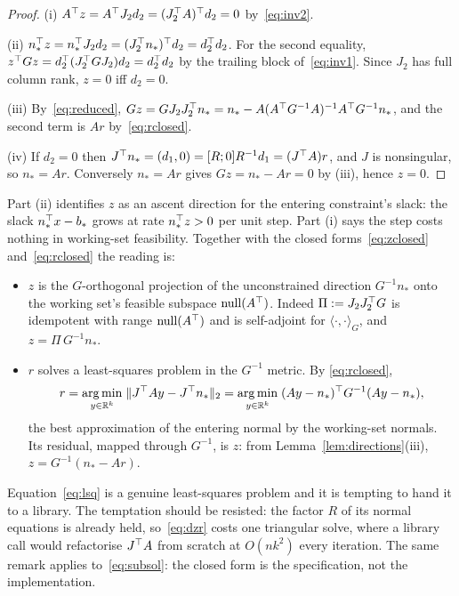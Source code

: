 \begin{proof}
(i) $A^{\top} z = A^{\top} J_2 d_2 = (J_2^{\top} A)^{\top} d_2 = 0$ by~\eqref{eq:inv2}.

(ii) $n_*^{\top} z = n_*^{\top} J_2 d_2 = (J_2^{\top} n_*)^{\top} d_2 = d_2^{\top} d_2$. For the second
equality, $z^{\top} G z = d_2^{\top} (J_2^{\top} G J_2) d_2 = d_2^{\top} d_2$ by the trailing block
of~\eqref{eq:inv1}. Since $J_2$ has full column rank, $z = 0$ iff $d_2 = 0$.

(iii) By~\eqref{eq:reduced}, $Gz = GJ_2J_2^{\top} n_* = n_* - A(A^{\top} G^{-1}A)^{-1}A^{\top}
G^{-1}n_*$, and the second term is $Ar$ by~\eqref{eq:rclosed}.

(iv) If $d_2 = 0$ then $J^{\top} n_* = (d_1,0) = [R;0]R^{-1}d_1 = (J^{\top} A) r$, and $J$
is nonsingular, so $n_* = Ar$. Conversely $n_* = Ar$ gives
$Gz = n_* - Ar = 0$ by (iii), hence $z = 0$.
\end{proof}

Part (ii) identifies $z$ as an ascent direction for the entering constraint's
slack: the slack $n_*^{\top} x - b_*$ grows at rate $n_*^{\top} z > 0$ per unit step. Part
(i) says the step costs nothing in working-set feasibility. Together with the
closed forms~\eqref{eq:zclosed} and~\eqref{eq:rclosed} the reading is:
\begin{itemize}
  \item $z$ is the $G$-orthogonal projection of the unconstrained direction
        $G^{-1}n_*$ onto the working set's feasible subspace $\operatorname{null}(A^{\top})$.
        Indeed $\Pi := J_2 J_2^{\top} G$ is idempotent with range $\operatorname{null}(A^{\top})$ and is
        self-adjoint for $\langle\cdot,\cdot\rangle_G$, and
        $z = \Pi\, G^{-1}n_*$.
  \item $r$ solves a least-squares problem in the $G^{-1}$ metric. By
        \eqref{eq:rclosed},
        \begin{equation}
          r = \operatorname*{arg\,min}_{y \in \mathbb{R}^k} \; \lVert J^{\top} A y - J^{\top} n_* \rVert_2
            = \operatorname*{arg\,min}_{y \in \mathbb{R}^k} \; (Ay - n_*)^{\top} G^{-1} (A y - n_*),
          \label{eq:lsq}
        \end{equation}
        the best approximation of the entering normal by the working-set normals.
        Its residual, mapped through $G^{-1}$, is $z$: from
        Lemma~\ref{lem:directions}(iii), $z = G^{-1}(n_* - Ar)$.
\end{itemize}

\begin{remark}
Equation~\eqref{eq:lsq} is a genuine least-squares problem and it is tempting to
hand it to a library. The temptation should be resisted: the factor $R$ of its
normal equations is already held, so~\eqref{eq:dzr} costs one triangular solve,
where a library call would refactorise $J^{\top} A$ from scratch at $O(nk^2)$ every
iteration. The same remark applies to~\eqref{eq:subsol}: the closed form is the
specification, not the implementation.
\end{remark}

